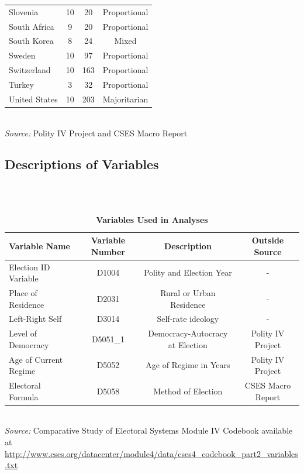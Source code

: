 \documentclass[12pt, titlepage]{article}
\newcommand\e{\emph}
\newcommand\tb{\textbf}
\begin{document}
\begin{appendices}
\begin{table} [h!]
\begin{tabulary}{\linewidth}{l c c c}
		Slovenia&10&20&Proportional\\
		South Africa&9&20& Proportional \\
		South Korea&8&24&Mixed\\
		Sweden&10&97&Proportional\\ 
		Switzerland&10&163&Proportional\\
		Turkey&3&32&Proportional\\
		United States&10&203&Majoritarian \\
		\hline
	\end{tabulary}
\\
\e{Source:} Polity IV Project and CSES Macro Report
\label{table101}
\end{table}

\clearpage 

\begin{landscape}
\section{Descriptions of Variables }
\label{AppendixA}

~~~\\\\

\begin{table}[h!]
	\centering
	\def\arraystretch{1.5}
	\caption{\tb{Variables Used in Analyses}}
	\begin{tabulary}{\linewidth}{l c c c}
		\\
		\hline
		\tb{Variable Name}& \tb{Variable Number} & \tb{Description}&\tb{Outside Source} \\
		\hline
		Election ID Variable &D1004&Polity and Election Year&-\\
		Place of Residence&D2031&Rural or Urban Residence&-\\
		Left-Right Self&D3014&Self-rate ideology &-\\
		Level of Democracy&D5051\_1&Democracy-Autocracy at Election&Polity IV Project\\
		Age of Current Regime&D5052&Age of Regime in Years& Polity IV Project\\
		Electoral Formula&D5058&Method of Election&CSES Macro Report\\
		\hline
	\end{tabulary}\\
	\e{Source:} Comparative Study of Electoral Systems Module IV Codebook available at \url{http://www.cses.org/datacenter/module4/data/cses4_codebook_part2_variables.txt}
	\label{table99}
\end{table}


\end{landscape}
\end{appendices}
\end{document}
